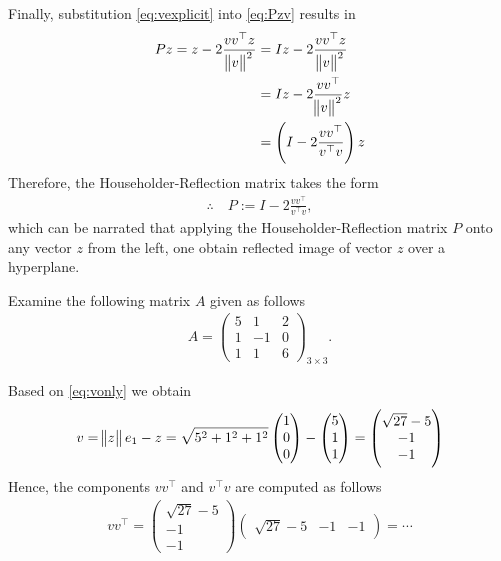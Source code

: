 \documentclass[12pt]{article}
\begin{document}
Finally, substitution \eqref{eq:vexplicit} into \eqref{eq:Pzv} results in
\begin{align}
	Pz = z -2 \frac{vv^{\top} z}{\norm[1]{v}^2}
	 & = Iz -2 \frac{vv^{\top} z}{\norm[1]{v}^2}          \\
	 & = Iz -2 \frac{vv^{\top}}{\norm[1]{v}^2}z           \\
	 & = \left( I -2 \frac{vv^{\top}}{v^{\top}v} \right)z
\end{align}
Therefore, the Householder-Reflection matrix takes the form
\begin{align}
	\therefore\quad\boxed{
		P:=	I -2 \frac{vv^{\top}}{v^{\top}v},
	}
\end{align}
which can be narrated that applying the Householder-Reflection matrix $P$
onto any vector $z$ from the left, one obtain 
reflected image of vector $z$ over a hyperplane.
\clearpage
\begin{exampleboxed}
	Examine the following matrix $A$ given as follows
	\begin{align}
		A = \begin{pmatrix} 5 &1 &2 \\ 1 &-1 &0 \\ 1 &1 &6 \end{pmatrix}_{3\times 3}.
	\end{align}
\end{exampleboxed}
Based on \eqref{eq:vonly} we obtain 
\begin{align}
	v 
	= \norm[1]{z}e_1 - z 
	= \sqrt{5^2+1^2+1^2}
	\begin{pmatrix} 1 \\ 0 \\ 0 \end{pmatrix}
	- 
	\begin{pmatrix} 5 \\ 1 \\ 1 \end{pmatrix}
	=
	\begin{pmatrix} \sqrt{27}-5 \\ -1 \\ -1 \end{pmatrix}
\end{align}
Hence, the components $vv^{\top}$ and $v^{\top}v$ are computed as follows
\begin{align}
	vv^{\top} = 
	\begin{pmatrix} \sqrt{27}-5 \\ -1 \\ -1 \end{pmatrix}
	\begin{pmatrix} \sqrt{27}-5 & -1 & -1 \end{pmatrix}
	=
	\cdots
\end{align}
\end{document}
